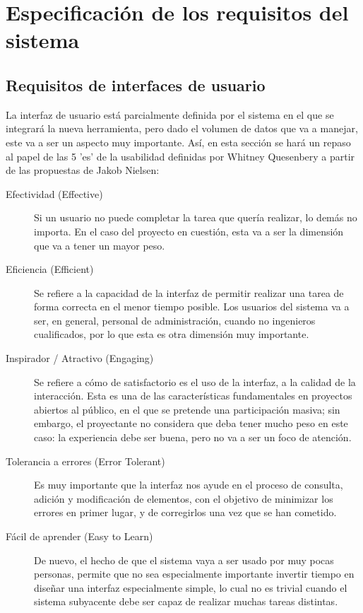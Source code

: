 \section{Especificación de los requisitos del sistema}

\subsection{Requisitos de interfaces de usuario}
\label{sec:requisitos_interfaz}

La interfaz de usuario está parcialmente definida por el sistema en el que se
integrará la nueva herramienta, pero dado el volumen de datos que va a
manejar, este va a ser un aspecto muy importante. Así, en esta sección se hará
un repaso al papel de las 5 'es' de la usabilidad definidas por Whitney
Quesenbery a partir de las propuestas de Jakob Nielsen:

\begin{description}
\item [Efectividad (Effective)] Si un usuario no puede completar la tarea que
quería realizar, lo demás no importa. En el caso del proyecto en cuestión, esta
va a ser la dimensión que va a tener un mayor peso.

\item [Eficiencia (Efficient)] Se refiere a la capacidad de la interfaz de
permitir realizar una tarea de forma correcta en el menor tiempo posible. Los
usuarios del sistema va a ser, en general, personal de administración, cuando no
ingenieros cualificados, por lo que esta es otra dimensión muy importante.

\item [Inspirador / Atractivo (Engaging)] Se refiere a cómo de satisfactorio
es el uso de la interfaz, a la calidad de la interacción. Esta es una de las
características fundamentales en proyectos abiertos al público, en el que se
pretende una participación masiva; sin embargo, el proyectante no considera que
deba tener mucho peso en este caso: la experiencia debe ser buena, pero no va a
ser un foco de atención.

\item [Tolerancia a errores (Error Tolerant)] Es muy importante que la interfaz
nos ayude en el proceso de consulta, adición y modificación de elementos, con el
objetivo de minimizar los errores en primer lugar, y de corregirlos una vez que
se han cometido.

\item [Fácil de aprender (Easy to Learn)] De nuevo, el hecho de que el sistema
vaya a ser usado por muy pocas personas, permite que no sea especialmente
importante invertir tiempo en diseñar una interfaz especialmente simple, lo
cual no es trivial cuando el sistema subyacente debe ser capaz de realizar
muchas tareas distintas.
\end{description}

